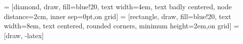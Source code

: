 \usepackage[spanish,es-tabla]{babel}
\usepackage[utf8]{inputenc}

\usepackage{graphicx}

\usepackage{hyperref}
\hypersetup{colorlinks=true,allcolors=blue}

\usepackage{booktabs}

\usepackage{amsmath}

\usepackage[absolute,overlay]{textpos}

\usepackage[justification=centering,labelformat=empty,labelsep=none]{caption}

\usepackage{tikz}
\usetikzlibrary{shapes,arrows,positioning}

 = [diamond, draw, fill=blue!20, text width=4em, text badly centered, node distance=2cm, inner sep=0pt,on grid]
 = [rectangle, draw, fill=blue!20, text width=8em, text centered, rounded corners, minimum height=2em,on grid]
 = [draw, -latex]

\usepackage[backend=biber]{biblatex}
\renewcommand{\footnotesize}{\tiny}








